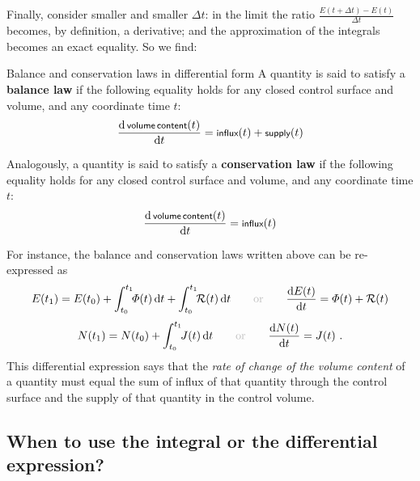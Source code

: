 \documentclass[a4paper,12pt,%
onecolumn,oneside,%
british%
]{memoir}
\newcommand*{\di}{\mathrm{d}}%
\newcommand*{\incr}{\Delta}%
\renewcommand*{\|}[1][]{\nonscript\:#1\vert\nonscript\:\mathopen{}}
\newcommand*{\yti}{t_{0}}
\newcommand*{\ytf}{t_{1}}
\newcommand*{\dt}{\di t}
\newcommand*{\Dt}{\incr t}
\newcommand*{\yN}{N}
\newcommand*{\yJ}{J}
\newcommand*{\yE}{E}
\newcommand*{\yH}{\varPhi}%
\newcommand*{\yR}{\mathcal{R}}%
\begin{document}
Finally, consider smaller and smaller $\Dt$: in the limit the ratio \enskip$\frac{\yE(t+\Dt)-\yE(t)}{\Dt}$\enskip becomes, by definition, a derivative; and the approximation of the integrals becomes an exact equality. So we find:
\begin{definition}{Balance and conservation laws in differential form}
  A quantity is said to satisfy a \textbf{balance law} if the following equality holds for any closed control surface and volume, and any coordinate time $t$:
  \begin{equation}
    \label{eq:balanced_diff}
    \frac{\di\,\textsf{\footnotesize volume\,content}(t)}{\dt} =
    \textsf{\footnotesize influx}(t) +
    \textsf{\footnotesize supply}(t)
  \end{equation}

  \smallskip

  Analogously, a quantity is said to satisfy a \textbf{conservation law} if the following equality holds for any closed control surface and volume, and any coordinate time $t$:
  \begin{equation}
    \label{eq:conserved_diff}
    \frac{\di\,\textsf{\footnotesize volume\,content}(t)}{\dt} =
    \textsf{\footnotesize influx}(t)
  \end{equation}
\end{definition}
For instance, the balance and conservation laws written above can be re-expressed as
  \begin{equation*}
    \begin{gathered}
  \yE(\ytf) = \yE(\yti)
  + \int_{\yti}^{\ytf}\!\!\yH(t)\, \dt
  + \int_{\yti}^{\ytf}\!\!\yR(t)\,\dt
  \qquad\text{\color{grey}or}\qquad
      \frac{\di\yE(t)}{\dt} = \yH(t) + \yR(t)
      \\[\jot]
      \yN(\ytf) = \yN(\yti) + \int_{\yti}^{\ytf}\!\!\yJ(t)\, \dt
  \qquad\text{\color{grey}or}\qquad
    \frac{\di\yN(t)}{\dt} = \yJ(t) \ .
    \end{gathered}
  \end{equation*}
This differential expression says that the \emph{rate of change of the volume content} of a quantity must equal the sum of influx of that quantity through the control surface and the supply of that quantity in the control volume.

\subsection{When to use the integral or the differential expression?}
\label{sec:when_int_diff}
\end{document}
